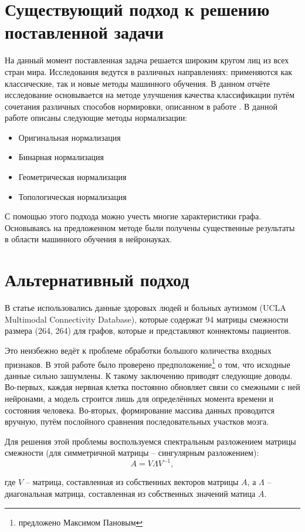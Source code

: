 \documentclass{urticle}
\newcommand{\mys}[1]{\newpage\section*{#1}}
\begin{document}
\mys{Существующий подход к решению поставленной задачи}
На данный момент поставленная задача решается широким кругом лиц из всех стран мира. Исследования ведутся в различных направлениях: применяются как классические, так и новые методы машинного обучения. В данном отчёте исследование основывается на методе улучшения качества классификации путём сочетания различных способов нормировки, описанном в работе \cite{article1}. В данной работе описаны следующие методы нормализации:
\begin{itemize}
	\item Оригинальная нормализация
	\item Бинарная нормализация
	\item Геометрическая нормализация
	\item Топологическая нормализация			
\end{itemize}

С помощью этого подхода можно учесть многие характеристики графа. Основываясь на предложенном методе были получены существенные результаты \cite{article1} в области машинного обучения в нейронауках.
\section*{Альтернативный подход}
В статье \cite{article1} использовались данные здоровых людей и больных аутизмом (UCLA Multimodal Connectivity Database), которые содержат 94 матрицы смежности размера (264, 264) для графов, которые и представляют коннектомы пациентов. 

Это неизбежно ведёт к проблеме обработки большого количества входных признаков. В этой работе было проверено предположение\footnote{предложено Максимом Пановым} о том, что исходные данные сильно зашумлены. К такому заключению приводят следующие доводы. Во-первых, каждая нервная клетка постоянно обновляет связи со смежными с ней нейронами,  а модель строится лишь для определённых момента времени и состояния человека. Во-вторых, формирование массива данных проводится вручную, путём послойного сравнения последовательных участков мозга.

Для решения этой проблемы воспользуемся спектральным разложением матрицы смежности (для симметричной матрицы -- сингулярным разложением):
\begin{equation}
	\label{SVD}
	A = V \Lambda V^{-1}, 
\end{equation} 

где $V$ -- матрица, составленная из собственных векторов матрицы $A$, а $\Lambda$ -- диагональная матрица, составленная из собственных значений матица $A$.
\end{document}
